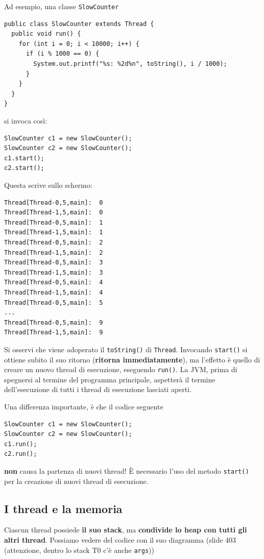 \documentclass[\fontsizeclass,twocolumn]{\classname}
\theoremstyle{definition}
\theoremstyle{definition}
\begin{document}
Ad esempio, una classe \texttt{SlowCounter}

\begin{lstlisting}
public class SlowCounter extends Thread {
  public void run() {
    for (int i = 0; i < 10000; i++) {
      if (i % 1000 == 0) {
        System.out.printf("%s: %2d%n", toString(), i / 1000);
      }
    }
  }
}
\end{lstlisting}

si invoca così:

\begin{lstlisting}
SlowCounter c1 = new SlowCounter();
SlowCounter c2 = new SlowCounter();
c1.start();
c2.start();
\end{lstlisting}

Questa scrive sullo schermo:

\begin{lstlisting}
Thread[Thread-0,5,main]:  0
Thread[Thread-1,5,main]:  0
Thread[Thread-0,5,main]:  1
Thread[Thread-1,5,main]:  1
Thread[Thread-0,5,main]:  2
Thread[Thread-1,5,main]:  2
Thread[Thread-0,5,main]:  3
Thread[Thread-1,5,main]:  3
Thread[Thread-0,5,main]:  4
Thread[Thread-1,5,main]:  4
Thread[Thread-0,5,main]:  5
...
Thread[Thread-0,5,main]:  9
Thread[Thread-1,5,main]:  9
\end{lstlisting}

Si osservi che viene adoperato il \texttt{toString()} di \texttt{Thread}.
Invocando \texttt{start()} si ottiene subito il suo ritorno (\textbf{ritorna
immediatamente}), ma l'effetto è quello di creare un nuovo thread di
esecuzione, eseguendo \texttt{run()}. La JVM, prima di spegnersi al termine del
programma principale, aspetterà il termine dell'esecuzione di tutti i thread di
esecuzione lasciati aperti.

Una differenza importante, è che il codice seguente

\begin{lstlisting}
SlowCounter c1 = new SlowCounter();
SlowCounter c2 = new SlowCounter();
c1.run();
c2.run();
\end{lstlisting}

\textbf{non} causa la partenza di nuovi thread! È necessario l'uso del metodo
\texttt{start()} per la creazione di nuovi thread di esecuzione.

\subsection{I thread e la memoria}

Ciascun thread possiede \textbf{il suo stack}, ma \textbf{condivide lo heap con
tutti gli altri thread}. Possiamo vedere del codice con il suo diagramma (slide
403 (attenzione, dentro lo stack T0 c'è anche \texttt{args}))
\end{document}
